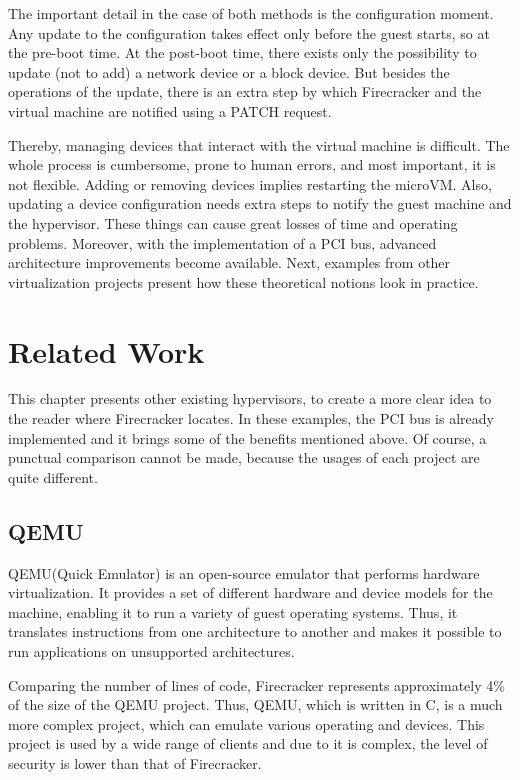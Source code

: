 \documentclass[12pt, a4paper]{report}
\begin{document}
The important detail in the case of both methods is the configuration moment. Any update to the configuration takes effect only before the guest starts, so at the pre-boot time. At the post-boot time, there exists only the possibility to update (not to add) a network device or a block device. But besides the operations of the update, there is an extra step by which Firecracker and the virtual machine are notified using a PATCH request.

Thereby, managing devices that interact with the virtual machine is difficult. The whole process is cumbersome, prone to human errors, and most important, it is not flexible. Adding or removing devices implies restarting the microVM. Also, updating a device configuration needs extra steps to notify the guest machine and the hypervisor. These things can cause great losses of time and operating problems. Moreover, with the implementation of a PCI bus, advanced architecture improvements become available. Next, examples from other virtualization projects present how these theoretical notions look in practice.


\chapter{Related Work}\label{Related Work}

This chapter presents other existing hypervisors, to create a more clear idea to the reader where Firecracker locates. In these examples, the PCI bus is already implemented and it brings some of the benefits mentioned above. Of course, a punctual comparison cannot be made, because the usages of each project are quite different.

\section{QEMU}

QEMU\footnotemark (Quick Emulator) is an open-source emulator that performs hardware virtualization. It provides a set of different hardware and device models for the machine, enabling it to run a variety of guest operating systems. Thus, it translates instructions from one architecture to another and makes it possible to run applications on unsupported architectures.

Comparing the number of lines of code, Firecracker represents approximately 4\% of the size of the QEMU project. Thus, QEMU, which is written in C, is a much more complex project, which can emulate various operating and devices. This project is used by a wide range of clients and due to it is complex, the level of security is lower than that of Firecracker.
\end{document}
